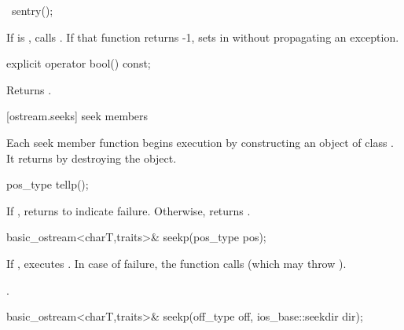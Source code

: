 %
\begin{itemdecl}
~sentry();
\end{itemdecl}

\begin{itemdescr}
\pnum
If
is
,
calls
. If that function returns -1, sets  in
 without propagating an exception.
\end{itemdescr}

%
%
\begin{itemdecl}
explicit operator bool() const;
\end{itemdecl}

\begin{itemdescr}
\pnum
\effects
Returns
.
\end{itemdescr}

[ostream.seeks]{ seek members}

\pnum
Each seek member function begins execution by constructing an object of class .
It returns by destroying the  object.

%
%
\begin{itemdecl}
pos_type tellp();
\end{itemdecl}

\begin{itemdescr}
\pnum
\returns
If
,
returns
to indicate failure.
Otherwise, returns
.
\begin{itemdecl}
basic_ostream<charT,traits>& seekp(pos_type pos);
\end{itemdecl}

\pnum
\effects
If
,
executes
.
In case of failure, the function calls
(which may throw
).

\pnum
\returns
{}.
\end{itemdescr}

%
%
\begin{itemdecl}
basic_ostream<charT,traits>& seekp(off_type off, ios_base::seekdir dir);
\end{itemdecl}

